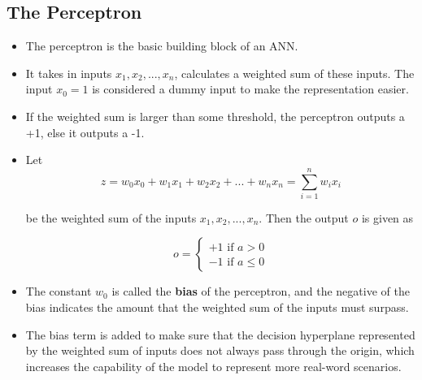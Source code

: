 \documentclass{article}
\theoremstyle{plain}
\theoremstyle{definition}
\begin{document}
\subsection{The Perceptron}
\begin{itemize}
    \item The perceptron is the basic building block of an ANN. 
    
    \item It takes in inputs $x_1, x_2, ..., x_n$, calculates a weighted sum of these inputs. The input $x_0 = 1$ is considered a dummy input to make the representation easier.
    
    \item If the weighted sum is larger than some threshold, the perceptron outputs a +1, else it outputs a -1. 
    
    \item Let
    \begin{equation*}
        z = w_0 x_0 + w_1 x_1 + w_2 x_2 + ... + w_n x_n = \sum_{i=1}^{n} w_i x_i
    \end{equation*}
    
    be the weighted sum of the inputs $x_1, x_2, ..., x_n$. Then the output $o$ is given as
    
    \begin{equation}
        o = \begin{cases}
            +1 \text{ if } a>0\\
            -1 \text{ if } a \le 0
        \end{cases}
    \end{equation}
    
    \item The constant $w_0$ is called the \textbf{bias} of the perceptron, and the negative of the bias indicates the amount that the weighted sum of the inputs must surpass. 
    
    \item The bias term is added to make sure that the decision hyperplane represented by the weighted sum of inputs does not always pass through the origin, which increases the capability of the model to represent more real-word scenarios.
\end{itemize}
\end{document}
